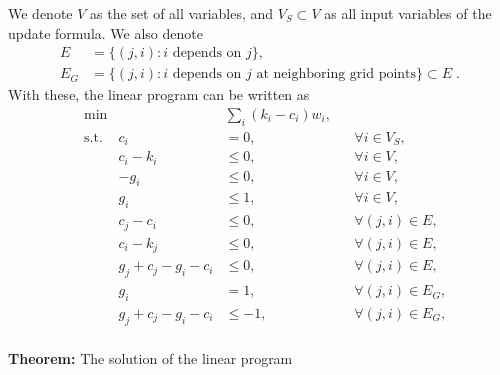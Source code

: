 \documentclass[12pt]{article}
\begin{document}
We denote $V$ as the set of all variables, and $V_S\subset V$ as all input variables of the update formula.  We also denote
\[\begin{split}
E &= \{(j,i) : i \textrm{ depends on }j\},\\
E_G &= \{(j,i) : i \textrm{ depends on } j \textrm{ at neighboring grid points}\} \subset E \;.
\end{split}\]
With these, the linear program can be written as
\begin{equation}
\begin{aligned}
& \min && \sum_i (k_i - c_i) w_i,               && \\
& \textrm{s.t.} & c_i &= 0,                     && \forall i\in V_S, \\
&               & c_i - k_i &\le 0,             && \forall i\in V, \\
&               &-g_i &\le 0,                   && \forall i\in V, \\
&               & g_i &\le 1,                   && \forall i\in V, \\
&               & c_j - c_i &\le 0,             && \forall (j,i) \in E, \\
&               & c_i - k_j &\le 0,             && \forall (j,i) \in E, \\
&               & g_j + c_j - g_i - c_i &\le 0, && \forall (j,i) \in E, \\
&               & g_i &= 1,                     && \forall (j,i) \in E_G,\\
&               & g_j + c_j - g_i - c_i &\le-1, && \forall (j,i) \in E_G,\\
\end{aligned}
\end{equation}

{\bf Theorem:} The solution of the linear program
\end{document}
